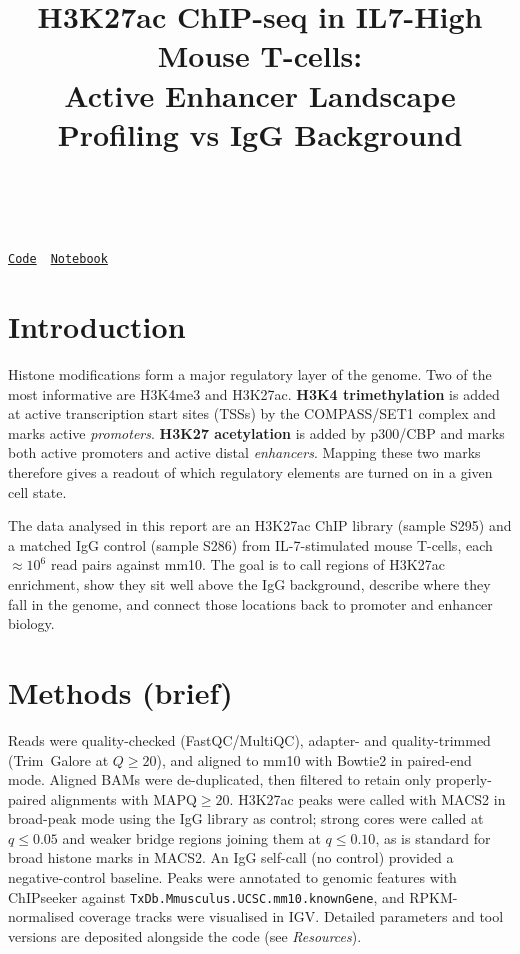 \documentclass[11pt,a4paper]{article}
\title{\vspace{-2em}\textbf{H3K27ac ChIP-seq in IL7-High Mouse T-cells:\\[-0.3em]
Active Enhancer Landscape Profiling vs IgG Background}}
\author{\studentname\ \textbar\ \studentid\ \textbar\ \coursecode}
\date{\vspace{-0.8em}\submissiondate}
\newcommand{\repourl}{https://github.com/hanara2112/chipseq.git}
\newcommand{\notebookurl}{https://hanara2112.github.io/chipseq/docs/extra_enhancer_analysis.html}
\begin{document}
\maketitle

\begin{center}\normalsize
\href{\repourl}{\texttt{Code}}\ \textbar\ 
\href{\notebookurl}{\texttt{Notebook}}
\end{center}

\section*{Introduction}
Histone modifications form a major regulatory layer of the genome. Two of the most informative are H3K4me3 and H3K27ac. \textbf{H3K4 trimethylation} is added at active transcription start sites (TSSs) by the COMPASS/SET1 complex and marks active \emph{promoters}. \textbf{H3K27 acetylation} is added by p300/CBP and marks both active promoters and active distal \emph{enhancers}. Mapping these two marks therefore gives a readout of which regulatory elements are turned on in a given cell state.

The data analysed in this report are an H3K27ac ChIP library (sample S295) and a matched IgG control (sample S286) from IL-7-stimulated mouse T-cells, each $\approx\!10^{6}$ read pairs against mm10. The goal is to call regions of H3K27ac enrichment, show they sit well above the IgG background, describe where they fall in the genome, and connect those locations back to promoter and enhancer biology.

\section*{Methods (brief)}
Reads were quality-checked (FastQC/MultiQC), adapter- and quality-trimmed (Trim~Galore at $Q\!\geq\!20$), and aligned to mm10 with Bowtie2 in paired-end mode. Aligned BAMs were de-duplicated, then filtered to retain only properly-paired alignments with $\text{MAPQ}\!\geq\!20$. H3K27ac peaks were called with MACS2 in broad-peak mode using the IgG library as control; strong cores were called at $q\!\leq\!0.05$ and weaker bridge regions joining them at $q\!\leq\!0.10$, as is standard for broad histone marks in MACS2. An IgG self-call (no control) provided a negative-control baseline. Peaks were annotated to genomic features with ChIPseeker against \texttt{TxDb.Mmusculus.UCSC.mm10.knownGene}, and RPKM-normalised coverage tracks were visualised in IGV. Detailed parameters and tool versions are deposited alongside the code (see \emph{Resources}).
\end{document}
